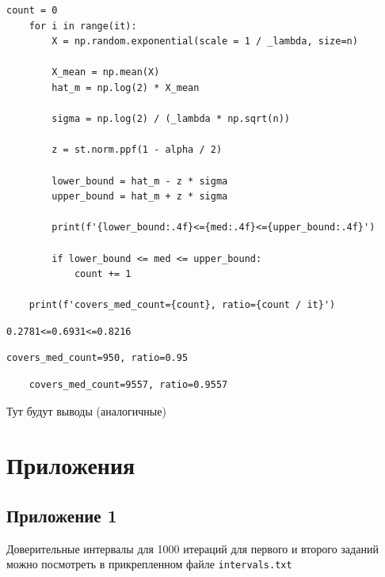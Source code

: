 \documentclass[a4paper, 12pt]{article}
\begin{document}
    \begin{lstlisting}[label=code2, caption={code2}]
    count = 0
    for i in range(it):
        X = np.random.exponential(scale = 1 / _lambda, size=n)

        X_mean = np.mean(X)
        hat_m = np.log(2) * X_mean

        sigma = np.log(2) / (_lambda * np.sqrt(n))

        z = st.norm.ppf(1 - alpha / 2)

        lower_bound = hat_m - z * sigma
        upper_bound = hat_m + z * sigma

        print(f'{lower_bound:.4f}<={med:.4f}<={upper_bound:.4f}')

        if lower_bound <= med <= upper_bound:
            count += 1

    print(f'covers_med_count={count}, ratio={count / it}')
    \end{lstlisting}


    \begin{lstlisting}[label=int2, caption={int2}]
    0.2781<=0.6931<=0.8216
    \end{lstlisting}


    \begin{lstlisting}[label=covers2_1000, caption={covers}]
    covers_med_count=950, ratio=0.95
    \end{lstlisting}


    \begin{lstlisting}
    covers_med_count=9557, ratio=0.9557
    \end{lstlisting}


    Тут будут выводы (аналогичные)


    \section{Приложения}
    \subsection{Приложение 1}
    Доверительные интервалы для 1000 итераций для первого и второго заданий можно посмотреть в прикрепленном файле \texttt{intervals.txt}
\end{document}
